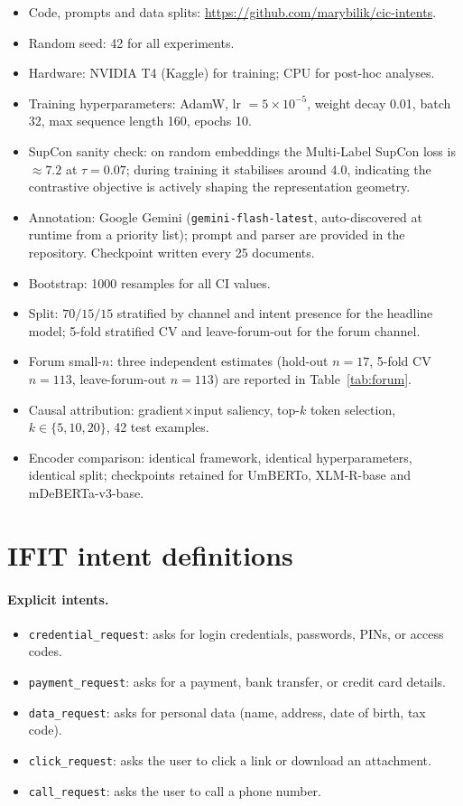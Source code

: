 \documentclass[preprint,12pt,authoryear]{elsarticle}
\begin{document}
\begin{itemize}
\item Code, prompts and data splits:
      \url{https://github.com/marybilik/cic-intents}.
\item Random seed: 42 for all experiments.
\item Hardware: NVIDIA T4 (Kaggle) for training; CPU for post-hoc
      analyses.
\item Training hyperparameters: AdamW, lr $= 5 \times 10^{-5}$,
      weight decay 0.01, batch 32, max sequence length 160,
      epochs 10.
\item SupCon sanity check: on random embeddings the Multi-Label
      SupCon loss is $\approx 7.2$ at $\tau = 0.07$; during training
      it stabilises around $4.0$, indicating the contrastive
      objective is actively shaping the representation geometry.
\item Annotation: Google Gemini (\texttt{gemini-flash-latest},
      auto-discovered at runtime from a priority list); prompt and
      parser are provided in the repository. Checkpoint written
      every 25 documents.
\item Bootstrap: 1000 resamples for all CI values.
\item Split: $70/15/15$ stratified by channel and intent presence
      for the headline model; 5-fold stratified CV and
      leave-forum-out for the forum channel.
\item Forum small-$n$: three independent estimates (hold-out
      $n=17$, 5-fold CV $n=113$, leave-forum-out $n=113$) are
      reported in Table~\ref{tab:forum}.
\item Causal attribution: gradient$\times$input saliency, top-$k$
      token selection, $k \in \{5,10,20\}$, 42 test examples.
\item Encoder comparison: identical framework, identical
      hyperparameters, identical split; checkpoints retained for
      UmBERTo, XLM-R-base and mDeBERTa-v3-base.
\end{itemize}

\section{IFIT intent definitions}
\label{app:ifit}

\paragraph*{Explicit intents.}
\begin{itemize}
\item \texttt{credential\_request}: asks for login credentials,
      passwords, PINs, or access codes.
\item \texttt{payment\_request}: asks for a payment, bank transfer,
      or credit card details.
\item \texttt{data\_request}: asks for personal data (name, address,
      date of birth, tax code).
\item \texttt{click\_request}: asks the user to click a link or
      download an attachment.
\item \texttt{call\_request}: asks the user to call a phone number.
\end{itemize}
\end{document}
